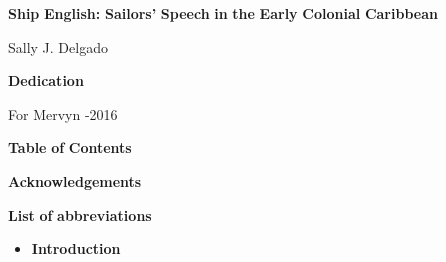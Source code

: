 

\textbf{Ship} \textbf{English:} \textbf{Sailors’} \textbf{Speech} \textbf{in} \textbf{the} \textbf{Early} \textbf{Colonial} \textbf{Caribbean}

Sally J. Delgado

\textbf{Dedication}

For Mervyn \citealt{Alleyne1993}-2016

\begin{styleNormali}
\textbf{Table} \textbf{of} \textbf{Contents}
\end{styleNormali}

\begin{styleNormali}
\textbf{Acknowledgements} 
\end{styleNormali}

\begin{styleNormali}
\textbf{List} \textbf{of} \textbf{abbreviations} 
\end{styleNormali}

\begin{itemize}
\item \begin{styleNormali}
\textbf{Introduction} 
\end{styleNormali}
\end{itemize}

